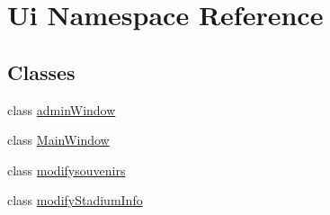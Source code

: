 \hypertarget{namespace_ui}{}\section{Ui Namespace Reference}
\label{namespace_ui}
\subsection*{Classes}
\begin{DoxyCompactItemize}
\item 
class \hyperlink{class_ui_1_1admin_window}{admin\+Window}
\item 
class \hyperlink{class_ui_1_1_main_window}{Main\+Window}
\item 
class \hyperlink{class_ui_1_1modifysouvenirs}{modifysouvenirs}
\item 
class \hyperlink{class_ui_1_1modify_stadium_info}{modify\+Stadium\+Info}
\end{DoxyCompactItemize}
